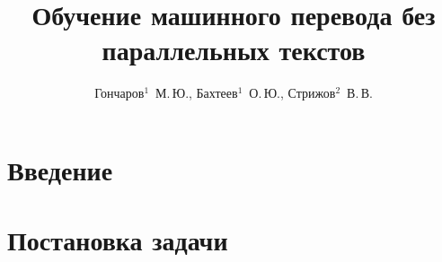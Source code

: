 \documentclass[12pt,twoside]{article}
\title[Обучение машинного перевода без параллельных текстов]{
   Обучение машинного перевода без параллельных текстов
}
\author[Гончаров$^1$~М.\,Ю., Бахтеев$^1$~О.\,Ю., Стрижов$^2$~В.\,В.]{
   Гончаров$^1$~М.\,Ю., Бахтеев$^1$~О.\,Ю., Стрижов$^2$~В.\,В.
}[Гончаров$^1$~М.\,Ю., Бахтеев$^1$~О.\,Ю., Стрижов$^2$~В.\,В.]
\begin{document}
\maketitle

\section{Введение}

\section{Постановка задачи}




\end{document}
